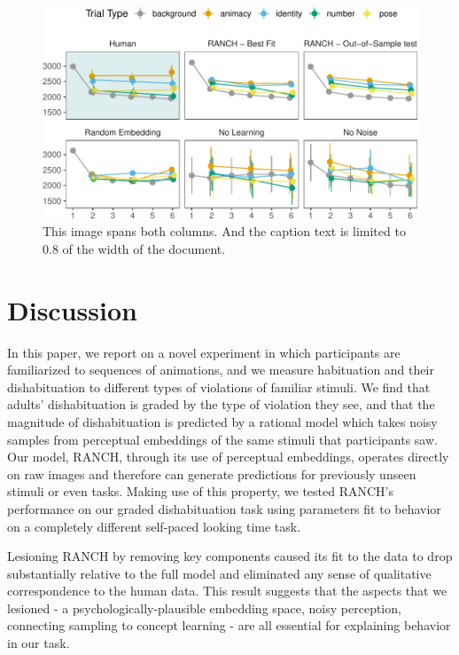 \documentclass[10pt, letterpaper]{article}
\newenvironment{CodeChunk}{}{}
\begin{document}
\begin{CodeChunk}
\begin{figure}[h]

{\centering \includegraphics{figs/lol-1} 

}

\caption[This image spans both columns]{This image spans both columns. And the caption text is limited to 0.8 of the width of the document.}\label{fig:lol}
\end{figure}
\end{CodeChunk}

\hypertarget{discussion}{%
\section{Discussion}\label{discussion}}

In this paper, we report on a novel experiment in which participants are
familiarized to sequences of animations, and we measure habituation and
their dishabituation to different types of violations of familiar
stimuli. We find that adults' dishabituation is graded by the type of
violation they see, and that the magnitude of dishabituation is
predicted by a rational model which takes noisy samples from perceptual
embeddings of the same stimuli that participants saw. Our model, RANCH,
through its use of perceptual embeddings, operates directly on raw
images and therefore can generate predictions for previously unseen
stimuli or even tasks. Making use of this property, we tested RANCH's
performance on our graded dishabituation task using parameters fit to
behavior on a completely different self-paced looking time task.

Lesioning RANCH by removing key components caused its fit to the data to
drop substantially relative to the full model and eliminated any sense
of qualitative correspondence to the human data. This result suggests
that the aspects that we lesioned - a psychologically-plausible
embedding space, noisy perception, connecting sampling to concept
learning - are all essential for explaining behavior in our task.
\end{document}
